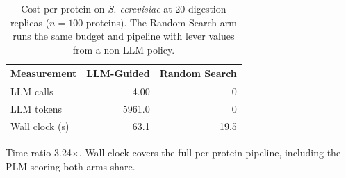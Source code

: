 \begin{table}[!tb]
  \centering
  \caption{Cost per protein on \textnormal{\textnormal{\textit{S. cerevisiae}}} at 20 digestion replicas ($n=100$ proteins). The Random Search arm runs the same budget and pipeline with lever values from a non-LLM policy.}
  \label{tab:cost_yeast_r20}
  \begin{tabular}{lrr}
    \toprule
    Measurement & LLM-Guided & Random Search \\
    \midrule
    LLM calls & 4.00 & 0 \\
    LLM tokens & 5961.0 & 0 \\
    Wall clock (s) & 63.1 & 19.5 \\
    \bottomrule
  \end{tabular}
  \par\smallskip\footnotesize{Time ratio 3.24$\times$. Wall clock covers the full per-protein pipeline, including the PLM scoring both arms share.}
\end{table}
